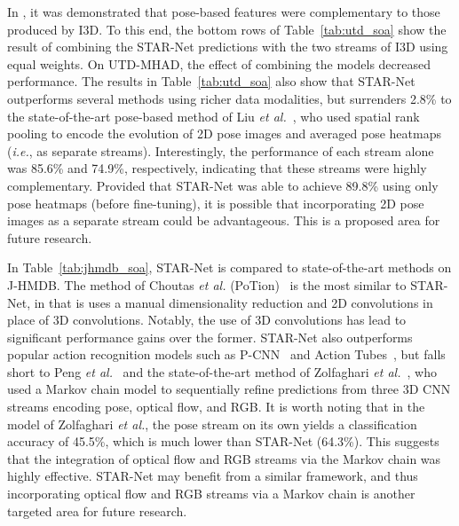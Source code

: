 \documentclass[10pt, conference, compsocconf]{IEEEtran}
\begin{document}
In \cite{choutas2018potion}, it was demonstrated that pose-based features were complementary to those produced by I3D. To this end, the bottom rows of Table~\ref{tab:utd_soa} show the result of combining the STAR-Net predictions with the two streams of I3D using equal weights. On UTD-MHAD, the effect of combining the models decreased performance. The results in Table~\ref{tab:utd_soa} also show that STAR-Net outperforms several methods using richer data modalities, but surrenders 2.8\% to the state-of-the-art pose-based method of Liu \textit{et al.}~\cite{liu2018recognizing}, who used spatial rank pooling to encode the evolution of 2D pose images and averaged pose heatmaps (\textit{i.e.}, as separate streams). Interestingly, the performance of each stream alone was 85.6\% and 74.9\%, respectively, indicating that these streams were highly complementary. Provided that STAR-Net was able to achieve 89.8\% using only pose heatmaps (before fine-tuning), it is possible that incorporating 2D pose images as a separate stream could be advantageous. This is a proposed area for future research.



In Table~\ref{tab:jhmdb_soa}, STAR-Net is compared to state-of-the-art methods on J-HMDB. The method of Choutas \textit{et al.} (PoTion)~\cite{choutas2018potion} is the most similar to STAR-Net, in that is uses a manual dimensionality reduction and 2D convolutions in place of 3D convolutions. Notably, the use of 3D convolutions has lead to significant performance gains over the former. STAR-Net also outperforms popular action recognition models such as P-CNN~\cite{cheronICCV15} and Action Tubes~\cite{gkioxari2015finding}, but falls short to Peng \textit{et al.}~\cite{peng2016multi} and the state-of-the-art method of Zolfaghari \textit{et al.}~\cite{zolfaghari2017chained}, who used a Markov chain model to sequentially refine predictions from three 3D CNN streams encoding pose, optical flow, and RGB. It is worth noting that in the model of Zolfaghari \textit{et al.}, the pose stream on its own yields a classification accuracy of 45.5\%, which is much lower than STAR-Net (64.3\%). This suggests that the integration of optical flow and RGB streams via the Markov chain was highly effective. STAR-Net may benefit from a similar framework, and thus incorporating optical flow and RGB streams via a Markov chain is another targeted area for future research.
\end{document}
